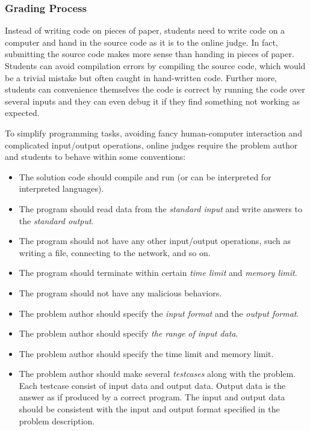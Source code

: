         \subsubsection{Grading Process}

            Instead of writing code on pieces of paper, students need to write code on a computer
            and hand in the source code as it is to the online judge.
            In fact, submitting the source code makes more sense than handing in pieces of paper.
            Students can avoid compilation errors by compiling the source code,
            which would be a trivial mistake but often caught in hand-written code.
            Further more, students can convenience themselves the code is correct by running the code
            over several inputs and they can even debug it if they find something not working as expected.

            To simplify programming tasks, avoiding fancy human-computer interaction
            and complicated input/output operations, online judges require the problem author and students
            to behave within some conventions:

            \begin{itemize}
                \item The solution code should compile and run (or can be interpreted for interpreted languages).
                \item The program should read data from the \emph{standard input}
                      and write answers to the \emph{standard output}.
                \item The program should not have any other input/output operations, such as writing a file,
                      connecting to the network, and so on.
                \item The program should terminate within certain \emph{time limit} and \emph{memory limit}.
                \item The program should not have any malicious behaviors.
                \item The problem author should specify the \emph{input format} and the \emph{output format}.
                \item The problem author should specify \emph{the range of input data}.
                \item The problem author should specify the time limit and memory limit.
                \item The problem author should make several \emph{testcases} along with the problem.
                      Each testcase consist of input data and output data.
                      Output data is the answer as if produced by a correct program.
                      The input and output data should be consistent with the input and output format
                      specified in the problem description.
            \end{itemize}

